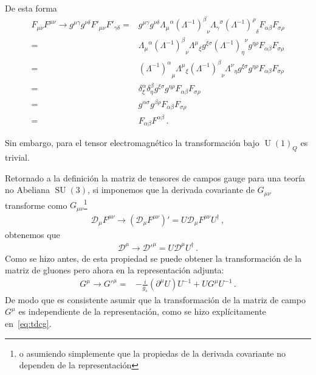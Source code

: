 \begin{frame}
De esta forma
\begin{align}
  F_{\mu\nu}F^{\mu\nu}\to   g^{\mu\gamma}g^{\nu\delta} F'_{\mu\nu} F'_{\gamma\delta}=&
  g^{\mu\gamma}g^{\nu\delta} { \Lambda_{\mu}}^{\alpha}  {\left( \Lambda^{-1} \right)^{\beta}}_{\nu}
{ \Lambda_{\gamma}}^{\sigma}  {\left( \Lambda^{-1} \right)^{\rho}}_{\delta}
F_{\alpha\beta}F_{\sigma\rho} \nonumber\\
  =&
   { \Lambda_{\mu}}^{\alpha}  {\left( \Lambda^{-1} \right)^{\beta}}_{\nu}
{ \Lambda^{\mu}}_{\xi}g^{\xi\sigma}  {\left( \Lambda^{-1} \right)_{\eta}}^{\nu}g^{\eta\rho}
F_{\alpha\beta}F_{\sigma\rho}  \nonumber\\
  =& {\left( \Lambda^{-1} \right)^{\alpha}}_{\mu} { \Lambda^{\mu}}_{\xi}
    {\left( \Lambda^{-1} \right)^{\beta}}_{\nu}
 {\Lambda^{\nu}}_{\eta} g^{\xi\sigma}  g^{\eta\rho}
F_{\alpha\beta}F_{\sigma\rho} \nonumber\\
  =& \delta^{\alpha}_{\xi}\delta^{\beta}_{\eta}g^{\xi\sigma}  g^{\eta\rho}
F_{\alpha\beta}F_{\sigma\rho} \nonumber\\
  =& g^{\alpha\sigma}  g^{\beta\rho}
F_{\alpha\beta}F_{\sigma\rho} \nonumber\\
  =& F_{\alpha\beta}F^{\alpha\beta}\,.
\end{align}


Sin embargo, para el tensor electromagnético la transformación bajo $\operatorname{U}(1)_Q$ es trivial.

Retornado a la definición la matriz de tensores de campos gauge para una teoría no Abeliana $\operatorname{SU}(3)$, 
si imponemos que la derivada covariante de $G_{\mu\nu}$ transforme como $G_{\mu\nu}$\footnote{o asumiendo simplemente que la propiedas de la derivada covariante no dependen de la representación}
\begin{align}
  \mathcal{D}_{\mu}F^{\mu\nu} \to \left(  \mathcal{D}_{\mu}F^{\mu\nu}  \right)'=
    U \mathcal{D}_{\mu}F^{\mu\nu} U^{\dagger}\,,
\end{align}
obtenemos que
\begin{align}
{\mathcal{D}}^\mu \to   {\mathcal{D}'}^\mu =U {\mathcal{D}}^\mu U^{\dagger}\,.
\end{align}
Como se hizo antes, de esta propiedad se puede obtener la transformación de la matriz de gluones pero ahora en la representación adjunta:
\begin{align}
 G^{\mu}\to  {G'}^\mu  =&-\frac{i}{g_s}(\partial^\mu U)U^{-1}+ U{G}^\mu U^{-1}\,.  
\end{align}
De modo que es consistente asumir que la transformación de la matriz de  campo $G^{\mu}$ es independiente de la representación, como se hizo explícitamente en~\eqref{eq:tdcg}.


\end{frame}
